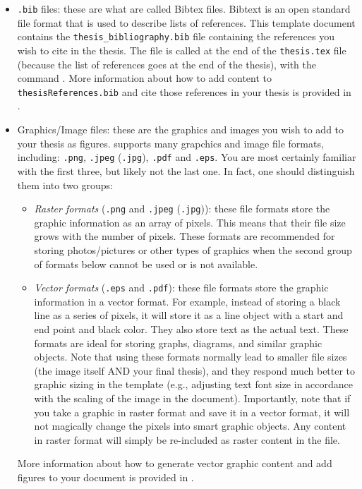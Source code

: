 \begin{itemize}
  \item \verb|.bib| files: these are what are called Bibtex files. Bibtext is an open standard file format that is used to describe lists of references. This template document contains the \verb|thesis_bibliography.bib| file containing the references you wish to cite in the thesis. The file is called at the end of the \verb|thesis.tex| file (because the list of references goes at the end of the thesis), with the command \verb||.
  More information about how to add content to \verb|thesisReferences.bib| and cite those references in your thesis is provided in .
  
  \item Graphics/Image files: these are the graphics and images you wish to add to your thesis as figures.  supports many grapchics and image file formats, including: \verb|.png|, \verb|.jpeg| (\verb|.jpg|), \verb|.pdf| and \verb|.eps|. 
  You are most certainly familiar with the first three, but likely not the last one. 
  In fact, one should distinguish them into two groups:
      \begin{itemize}
        \item \emph{Raster formats} (\verb|.png| and \verb|.jpeg| (\verb|.jpg|)): these file formats store the graphic information as an array of pixels. This means that their file size grows with the number of pixels. These formats are recommended for storing photos/pictures or other types of graphics when the second group of formats below cannot be used or is not available. 
        
        \item \emph{Vector formats} (\verb|.eps| and \verb|.pdf|): these file formats store the graphic information in a vector format. For example, instead of storing a black line as a series of pixels, it will store it as a line object with a start and end point and black color. They also store text as the actual text. These formats are ideal for storing graphs, diagrams, and similar graphic objects. Note that using these formats normally lead to smaller file sizes (the image itself AND your final thesis), and they respond much better to graphic sizing in the template (e.g., adjusting text font size in accordance with the scaling of the image in the document). Importantly, note that if you take a graphic in raster format and save it in a vector format, it will not magically change the pixels into smart graphic objects. Any content in raster format will simply be re-included as raster content in the file. 
      \end{itemize}
      
      More information about how to generate vector graphic content and add figures to your document is provided in .
  
\end{itemize}



